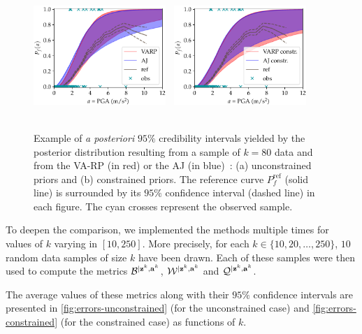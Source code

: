\begin{figure}[h]
    \centering
    \includegraphics[width=5cm]{figures/constr-frags/ex_ASG_unconstr80.pdf}\ %
    \includegraphics[width=5cm]{figures/constr-frags/ex_ASG_constr80.pdf}\\%
    \ 
    \caption{Example of \emph{a posteriori} $95\%$ credibility intervals yielded by the posterior distribution resulting from a sample of $k=80$ data and from the VA-RP (in red) or the AJ (in blue)~: (a) unconstrained priors and (b) constrained priors.
    The reference curve $P^{\text{ref}}_f$ (solid line) is surrounded by its $95\%$ confidence interval (dashed line) in each figure. The cyan crosses represent the observed sample.}
    \label{fig:frag-ex-asg}   
\end{figure}



To deepen the comparison, 
we implemented the methods multiple times for values of $k$ varying in $[10,250]$. More precisely, for each $k\in\{10,20,\dots,250\}$, $10$ random data samples of size $k$ have been drawn. Each of these samples were then used to compute the metrics $\mathcal{B}^{|\mathbf{z}^k,\mathbf{a}^k}$, $\mathcal{W}^{|\mathbf{z}^k,\mathbf{a}^k}$ and $\mathcal{Q}^{|\mathbf{z}^k,\mathbf{a}^k}$.

The average values of these metrics along with their $95\%$ confidence intervals are presented in \cref{fig:errors-unconstrained} (for the unconstrained case) and \cref{fig:errors-constrained} (for the constrained case) as functions of $k$.






